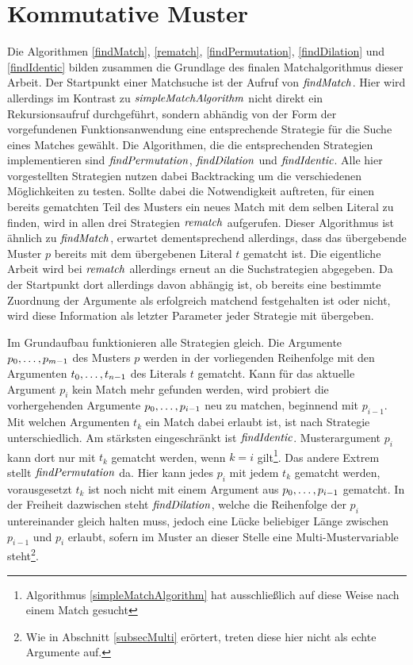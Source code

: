 \section{Kommutative Muster} \label{subsecACMuster}

Die Algorithmen \ref{findMatch}, \ref{rematch}, \ref{findPermutation}, \ref{findDilation} und \ref{findIdentic} bilden zusammen die Grundlage des finalen Matchalgorithmus dieser Arbeit. Der Startpunkt einer Matchsuche ist der Aufruf von $\mathit{findMatch}$. Hier wird allerdings im Kontrast zu $\mathit{simpleMatchAlgorithm}$ nicht direkt ein Rekursionsaufruf durchgeführt, sondern abhändig von der Form der vorgefundenen Funktionsanwendung eine entsprechende Strategie für die Suche eines Matches gewählt. Die Algorithmen, die die entsprechenden Strategien implementieren sind $\mathit{findPermutation}$, $\mathit{findDilation}$ und $\mathit{findIdentic}$. Alle hier vorgestellten Strategien nutzen dabei Backtracking um die verschiedenen Möglichkeiten zu testen. Sollte dabei die Notwendigkeit auftreten, für einen bereits gematchten Teil des Musters ein neues Match mit dem selben Literal zu finden, wird in allen drei Strategien $\mathit{rematch}$ aufgerufen. Dieser Algorithmus ist ähnlich zu $\mathit{findMatch}$, erwartet dementsprechend allerdings, dass das übergebende Muster $p$ bereits mit dem übergebenen Literal $t$ gematcht ist. Die eigentliche Arbeit wird bei $\mathit{rematch}$ allerdings erneut an die Suchstrategien abgegeben. Da der Startpunkt dort allerdings davon abhängig ist, ob bereits eine bestimmte Zuordnung der Argumente als erfolgreich matchend festgehalten ist oder nicht, wird diese Information als letzter Parameter jeder Strategie mit übergeben.


Im Grundaufbau funktionieren alle Strategien gleich. Die Argumente ${p}_{0}, \dots, {p}_{m-1}$ des Musters $p$ werden in der vorliegenden Reihenfolge mit den Argumenten ${t}_{0}, \dots, {t}_{n-1}$ des Literals $t$ gematcht. Kann für das aktuelle Argument $p_i$ kein Match mehr gefunden werden, wird probiert die vorhergehenden Argumente ${p}_{0}, \dots, {p}_{i-1}$ neu zu matchen, beginnend mit $p_{i-1}$. Mit welchen Argumenten $t_k$ ein Match dabei erlaubt ist, ist nach Strategie unterschiedlich. Am stärksten eingeschränkt ist $\mathit{findIdentic}$. Musterargument $p_i$ kann dort nur mit $t_k$ gematcht werden, wenn $k = i$ gilt\footnote{Algorithmus \ref{simpleMatchAlgorithm} hat ausschließlich auf diese Weise nach einem Match gesucht}. Das andere Extrem stellt $\mathit{findPermutation}$ da. Hier kann jedes $p_i$ mit jedem $t_k$ gematcht werden, vorausgesetzt $t_k$ ist noch nicht mit einem Argument aus ${p}_{0}, \dots, {p}_{i-1}$ gematcht. In der Freiheit dazwischen steht $\mathit{findDilation}$, welche die Reihenfolge der $p_i$ untereinander gleich halten muss, jedoch eine Lücke beliebiger Länge zwischen $p_{i-1}$ und $p_i$ erlaubt, sofern im Muster an dieser Stelle eine Multi-Mustervariable steht\footnote{Wie in Abschnitt \ref{subsecMulti} erörtert, treten diese hier nicht als echte Argumente auf.}.

